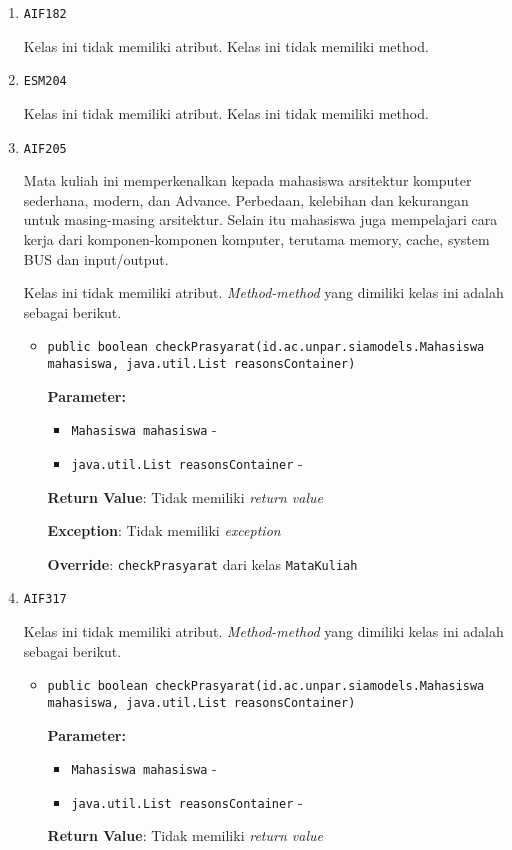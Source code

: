 \documentclass{article}
\begin{document}
\begin{enumerate}
\begin{itemize}
\end{itemize}
\item \texttt{AIF182}



Kelas ini tidak memiliki atribut. Kelas ini tidak memiliki method. \item \texttt{ESM204}



Kelas ini tidak memiliki atribut. Kelas ini tidak memiliki method. \item \texttt{AIF205}

Mata kuliah ini memperkenalkan kepada mahasiswa arsitektur komputer 
 sederhana, modern, dan Advance. Perbedaan, kelebihan dan kekurangan untuk 
 masing-masing arsitektur. Selain itu mahasiswa juga mempelajari cara kerja 
 dari komponen-komponen komputer, terutama memory, cache, system BUS dan 
 input/output.

Kelas ini tidak memiliki atribut. \textit{Method-method} yang dimiliki kelas ini adalah sebagai berikut.
\begin{itemize}
\item \texttt{public boolean checkPrasyarat(id.ac.unpar.siamodels.Mahasiswa mahasiswa, java.util.List reasonsContainer)}

\textbf{Parameter:}
\begin{itemize}
\item \texttt{Mahasiswa mahasiswa} - 
\item \texttt{java.util.List reasonsContainer} - 
\end{itemize}
\textbf{Return Value}: Tidak memiliki \textit{return value}

\textbf{Exception}: Tidak memiliki \textit{exception}

\textbf{Override}: \texttt{checkPrasyarat} dari kelas \texttt{MataKuliah}

\end{itemize}
\item \texttt{AIF317}



Kelas ini tidak memiliki atribut. \textit{Method-method} yang dimiliki kelas ini adalah sebagai berikut.
\begin{itemize}
\item \texttt{public boolean checkPrasyarat(id.ac.unpar.siamodels.Mahasiswa mahasiswa, java.util.List reasonsContainer)}

\textbf{Parameter:}
\begin{itemize}
\item \texttt{Mahasiswa mahasiswa} - 
\item \texttt{java.util.List reasonsContainer} - 
\end{itemize}
\textbf{Return Value}: Tidak memiliki \textit{return value}


\end{itemize}
\end{enumerate}
\end{document}
